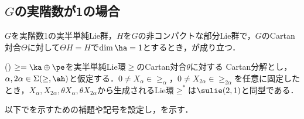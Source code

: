 \subsection{$ G$の実階数が1の場合}

\begin{thm}\label{thm:1216-main}
  $G$を実階数1の実半単純Lie群，$H$を$G$の非コンパクトな部分Lie群で，$G$のCartan対合$\Theta$に対して$\Theta H = H$で$\dim \ha = 1$とするとき，が成り立つ．
\end{thm}

\begin{thm}\label{thm:0810}(\cite[p.~409, Theorem~3.1]{hel01})
  $\ge = \ka \oplus \pe$を実半単純Lie環$\ge$のCartan対合$\theta$に対する Cartan分解とし，$\alpha,2\alpha\in \Sigma(\ge,\ah) $と仮定する．$0\neq X_{\alpha}\in \ge_{\alpha} $，$0\neq X_{2\alpha}\in \ge_{2\alpha} $を任意に固定したとき，$X_{\alpha},X_{2\alpha}, \theta X_{\alpha}, \theta X_{2\alpha} $から生成されるLie環$\ge^{*} $は$\sulie(2,1)$と同型である．
  
\end{thm}
以下でを示すための補題や記号を設定し，を示す．
